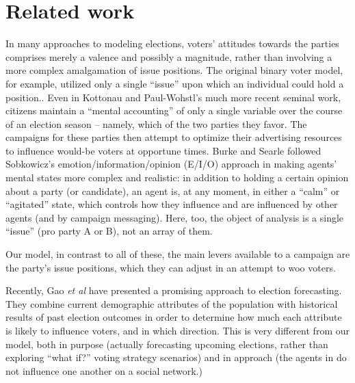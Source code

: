 \section{Related work}
\label{sec:related}


In many approaches to modeling elections, voters' attitudes towards the parties
comprises merely a valence and possibly a magnitude, rather than involving a
more complex amalgamation of issue positions. The original binary voter model,
for example, utilized only a single ``issue'' upon which an individual could
hold a position.\cite{holley_ergodic_1975,clifford_model_1973}. Even in
Kottonau and Paul-Wohstl's much more recent seminal
work\cite{kottonau_simulating_2004}, citizens maintain a ``mental accounting''
of only a single variable over the course of an election season -- namely,
which of the two parties they favor. The campaigns for these parties then
attempt to optimize their advertising resources to influence would-be voters at
opportune times. Burke and Searle\cite{burke_quantitatively_2022} followed
Sobkowicz's emotion/information/opinion (E/I/O)
approach\cite{sobkowicz_quantitative_2016} in making agents' mental states more
complex and realistic: in addition to holding a certain opinion about a party
(or candidate), an agent is, at any moment, in either a ``calm'' or
``agitated'' state, which controls how they influence and are influenced by
other agents (and by campaign messaging). Here, too, the object of analysis is
a single ``issue'' (pro party A or B), not an array of them.

Our model, in contrast to all of these, the main levers available to a campaign
are the party's issue positions, which they can adjust in an attempt to woo
voters.

Recently, Gao \textit{et al}\cite{gao_forecasting_2022} have presented a
promising approach to election forecasting. They combine current demographic
attributes of the population with historical results of past election outcomes
in order to determine how much each attribute is likely to influence voters,
and in which direction. This is very different from our model, both in purpose
(actually forecasting upcoming elections, rather than exploring ``what if?''
voting strategy scenarios) and in approach (the agents in
\cite{gao_forecasting_2022} do not influence one another on a social network.)

